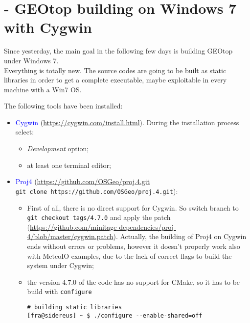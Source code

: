 \section{ - GEOtop building on Windows 7 with Cygwin}\label{sec:20150804}

Since yesterday, the main goal in the following few days is building GEOtop under Windows 7.\\

\noindent Everything is totally new. The source codes are going to be built as static libraries in order to get a complete executable, maybe exploitable in every machine with a Win7 OS.\par\medskip

\noindent The following tools have been installed:

\begin{itemize}
\item \textcolor{blue}{Cygwin} (\url{https://cygwin.com/install.html}). During the installation process select:
  \begin{itemize}
  \item \textit{Development} option;
  \item at least one terminal editor;
  \end{itemize}
\item \textcolor{blue}{Proj4} (\url{https://github.com/OSGeo/proj.4.git}\\\lstinline!git clone https://github.com/OSGeo/proj.4.git!):
  \begin{itemize}
  \item First of all, there is no direct support for Cygwin. So switch branch to \lstinline!git checkout tags/4.7.0! and apply the patch (\url{https://github.com/minitage-dependencies/proj-4/blob/master/cygwin.patch}). Actually, the building of Proj4 on Cygwin ends without errors or problems, however it doesn't properly work also with MeteoIO examples, due to the lack of correct flags to build the system under Cygwin;
  \item the version 4.7.0 of the code has no support for CMake, so it has to be build with \lstinline!configure!
    \begin{lstlisting}[style=bashStyle]
# building static libraries
[fra@sidereus] ~ $ ./configure --enable-shared=off

\end{lstlisting}
\end{itemize}
\end{itemize}
